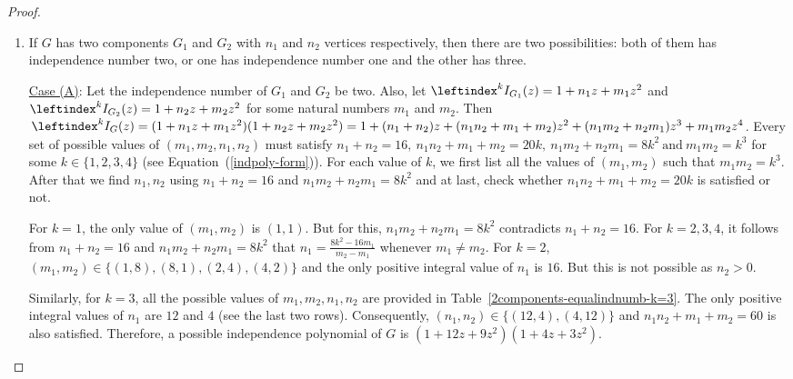\documentclass[12pt,a4paper]{article}
\theoremstyle{plain}
\numberwithin{equation}{section}
\begin{document}
\begin{proof}
\begin{enumerate}
\item If \(G\) has two components \(G_1\) and \(G_2\) with \(n_1\) and \(n_2\) vertices respectively, then there are two possibilities:  both of them has independence number two, or one has independence number one and the other has three.

\par \underline{Case (A)}:  Let the independence number of $ G_1 $ and $G_2$ be two. Also, let \(\leftindex^k{I}_{G_1}(z)=1+n_1z+m_1z^2\) and \(\leftindex^k{I}_{G_2}(z)=1+n_2z+m_2z^2\)  for some natural numbers \(m_1\) and \(m_2\). Then
$ \leftindex^k{I}_G(z) = (1+n_1z+m_1z^2)(1+n_2z+m_2z^2) = 1 + (n_1+n_2)z + (n_1n_2+m_1+m_2)z^2 + (n_1m_2+n_2m_1)z^3 + m_1m_2z^4$. Every set of possible values of \( (m_1, m_2, n_1, n_2)\) must satisfy  \(n_1+n_2 = 16, ~ n_1n_2+m_1+m_2 = 20k, ~ n_1m_2+ n_2m_1 = 8k^2 ~\text{and} ~ m_1m_2 = k^3\)
for some \(k \in \{1, 2, 3, 4\}\) (see Equation~(\ref{indpoly-form})). For each value of \(k\), we first list all the values of \((m_1, m_2)\) such that $m_1 m_2 =k^3$. After that we find $n_1, n_2$ using $n_1 +n_2 =16$ and $n_1 m_2 +n_2 m_1 =8k^2$ and at last, check whether $n_1 n_2 +m_1 +m_2=20k$ is satisfied or not.
\par
For \(k=1\), the only value of \((m_1, m_2)\) is \((1,1)\). But for this, $n_1 m_2 + n_2 m_1 =8 k^2$ contradicts $n_1 +n_2 =16$. For $k = 2,3,4$, it follows from $n_1 +n_2 =16$ and $n_1 m_2 + n_2 m_1=8k^2$ that $n_1 =\frac{8k^2- 16 m_1}{m_2 -m_1}$ whenever $m_1 \neq m_2$. For $k=2$, $(m_1, m_2) \in \{(1,8), (8,1), (2,4), (4,2)\}$ and the only positive integral value of $n_1$ is $16$. But this is not possible as $n_2 >0$.
\par Similarly, for $k=3$,  all the possible values of $m_1, m_2, n_1, n_2$ are provided in Table~\ref{2components-equalindnumb-k=3}. The only positive integral values of $n_1 $ are $12$ and $4$ (see the last two rows). Consequently, $(n_1, n_2) \in \{(12,4), (4,12)\}$ and $n_1 n_2 +m_1 +m_2=60$ is also satisfied. Therefore, a possible independence polynomial of \(G\) is $(1+12z+9z^2)(1+4z+3z^2)$.


\end{enumerate}
\end{proof}
\end{document}
